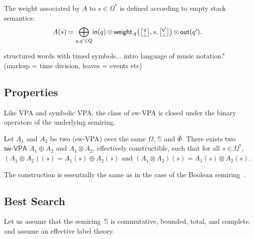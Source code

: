 \documentclass[runningheads]{llncs}
\newcommand{\Semiring}{\mathbb{S}}
\def\SWVPA{\textsf{sw-VPA}\xspace}
\def\weight{\mathsf{weight}}
\newcommand{\call}[1]{\ensuremath #1} %
\newcommand{\return}[1]{\ensuremath #1} %
\def\Omegai{{\Omega_\mathsf{i}}}
\def\Omegac{{\Omega_\mathsf{c}}}
\def\Omegar{{\Omega_\mathsf{r}}}
\def\Phii{{\Phi_\mathsf{i}}}
\def\Phir{{\Phi_\mathsf{r}}}
\def\Phicr{{\Phi_\mathsf{cr}}}
\newcommand{\config}[2]{\ensuremath \genfrac{[}{]}{0pt}{}{#1}{#2}}
\begin{document}
\noindent
The weight associated by $A$ to $s \in \Omega^*$
is defined according to empty stack semantics: 
%
\begin{equation}
A(s)  = 
{\displaystyle\bigoplus_{q, q' \in Q}} \textstyle
\mathsf{in}(q) \mathop{\otimes} 
\weight_A\bigl(\config{q}{\bot}, s, \config{q'}{\bot}\bigr) 
\mathop{\otimes} \mathsf{out}(q').
\label{eq:weightA}
\end{equation}

\begin{example}
structured words with timed symbols...
intro language of music notation? (markup = time division, leaves = events etc)
\end{example}


\subsection{Properties}
Like VPA and symbolic VPA, 
the class of \SWVPA is closed under the binary operators of the underlying semiring.
%
\begin{proposition}
Let $A_1$ and $A_2$ be two (\SWVPA)
over the same $\Omega$, $\Semiring$ and $\bar\Phi$.
There exists two $\SWVPA$ $A_1 \oplus A_2$ and $A_1 \otimes A_2$, 
effectively constructible, 
such that for all $s \in \Omega^*$, 
$(A_1 \oplus A_2)(s) = A_1(s) \oplus A_2(s)$ and 
$(A_1 \otimes A_2)(s) = A_1(s) \otimes A_2(s)$.
\end{proposition}
The construction is essentially the same 
as in the case of the Boolean semiring~\cite{dAntonyAlur14SVPDA}.


\subsection{Best Search} 
\label{sec:best}\label{sec:search}
Let us assume that the semiring~$\Semiring$ is
commutative, bounded, total, and complete.
and assume an effective label theory.

\end{document}
